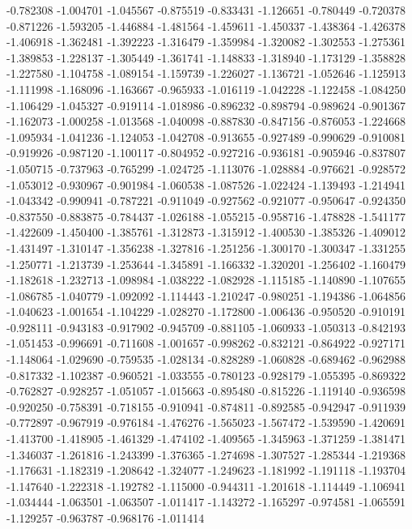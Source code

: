 -0.782308
-1.004701
-1.045567
-0.875519
-0.833431
-1.126651
-0.780449
-0.720378
-0.871226
-1.593205
-1.446884
-1.481564
-1.459611
-1.450337
-1.438364
-1.426378
-1.406918
-1.362481
-1.392223
-1.316479
-1.359984
-1.320082
-1.302553
-1.275361
-1.389853
-1.228137
-1.305449
-1.361741
-1.148833
-1.318940
-1.173129
-1.358828
-1.227580
-1.104758
-1.089154
-1.159739
-1.226027
-1.136721
-1.052646
-1.125913
-1.111998
-1.168096
-1.163667
-0.965933
-1.016119
-1.042228
-1.122458
-1.084250
-1.106429
-1.045327
-0.919114
-1.018986
-0.896232
-0.898794
-0.989624
-0.901367
-1.162073
-1.000258
-1.013568
-1.040098
-0.887830
-0.847156
-0.876053
-1.224668
-1.095934
-1.041236
-1.124053
-1.042708
-0.913655
-0.927489
-0.990629
-0.910081
-0.919926
-0.987120
-1.100117
-0.804952
-0.927216
-0.936181
-0.905946
-0.837807
-1.050715
-0.737963
-0.765299
-1.024725
-1.113076
-1.028884
-0.976621
-0.928572
-1.053012
-0.930967
-0.901984
-1.060538
-1.087526
-1.022424
-1.139493
-1.214941
-1.043342
-0.990941
-0.787221
-0.911049
-0.927562
-0.921077
-0.950647
-0.924350
-0.837550
-0.883875
-0.784437
-1.026188
-1.055215
-0.958716
-1.478828
-1.541177
-1.422609
-1.450400
-1.385761
-1.312873
-1.315912
-1.400530
-1.385326
-1.409012
-1.431497
-1.310147
-1.356238
-1.327816
-1.251256
-1.300170
-1.300347
-1.331255
-1.250771
-1.213739
-1.253644
-1.345891
-1.166332
-1.320201
-1.256402
-1.160479
-1.182618
-1.232713
-1.098984
-1.038222
-1.082928
-1.115185
-1.140890
-1.107655
-1.086785
-1.040779
-1.092092
-1.114443
-1.210247
-0.980251
-1.194386
-1.064856
-1.040623
-1.001654
-1.104229
-1.028270
-1.172800
-1.006436
-0.950520
-0.910191
-0.928111
-0.943183
-0.917902
-0.945709
-0.881105
-1.060933
-1.050313
-0.842193
-1.051453
-0.996691
-0.711608
-1.001657
-0.998262
-0.832121
-0.864922
-0.927171
-1.148064
-1.029690
-0.759535
-1.028134
-0.828289
-1.060828
-0.689462
-0.962988
-0.817332
-1.102387
-0.960521
-1.033555
-0.780123
-0.928179
-1.055395
-0.869322
-0.762827
-0.928257
-1.051057
-1.015663
-0.895480
-0.815226
-1.119140
-0.936598
-0.920250
-0.758391
-0.718155
-0.910941
-0.874811
-0.892585
-0.942947
-0.911939
-0.772897
-0.967919
-0.976184
-1.476276
-1.565023
-1.567472
-1.539590
-1.420691
-1.413700
-1.418905
-1.461329
-1.474102
-1.409565
-1.345963
-1.371259
-1.381471
-1.346037
-1.261816
-1.243399
-1.376365
-1.274698
-1.307527
-1.285344
-1.219368
-1.176631
-1.182319
-1.208642
-1.324077
-1.249623
-1.181992
-1.191118
-1.193704
-1.147640
-1.222318
-1.192782
-1.115000
-0.944311
-1.201618
-1.114449
-1.106941
-1.034444
-1.063501
-1.063507
-1.011417
-1.143272
-1.165297
-0.974581
-1.065591
-1.129257
-0.963787
-0.968176
-1.011414
